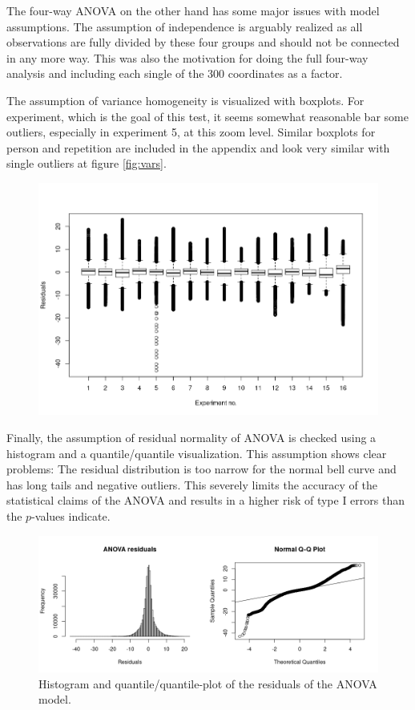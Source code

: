 \documentclass[11pt,fleqn]{article}
\begin{document}
The four-way ANOVA on the other hand has some major issues with model assumptions. The assumption of independence is arguably realized as all observations are fully divided by these four groups and should not be connected in any more way. This was also the motivation for doing the full four-way analysis and including each single of the 300 coordinates as a factor.

The assumption of variance homogeneity is visualized with boxplots. For experiment, which is the goal of this test, it seems somewhat reasonable bar some outliers, especially in experiment 5, at this zoom level. Similar boxplots for person and repetition are included in the appendix and look very similar with single outliers at figure \ref{fig:vars}.
\begin{figure}[H]
	\centering
	\includegraphics[width=.7\textwidth]{var_exp}
\label{fig:vexp}
\end{figure}\noindent
Finally, the assumption of residual normality of ANOVA is checked using a histogram and a quantile/quantile visualization. This assumption shows clear problems: The residual distribution is too narrow for the normal bell curve and has long tails and negative outliers. This severely limits the accuracy of the statistical claims of the ANOVA and results in a higher risk of type I errors than the \(p\)-values indicate.
\begin{figure}[H]
	\centering
	\includegraphics[width=.7\textwidth]{qq}
	\caption{Histogram and quantile/quantile-plot of the residuals of the ANOVA model.}\label{fig:qq}
\end{figure}
\end{document}
